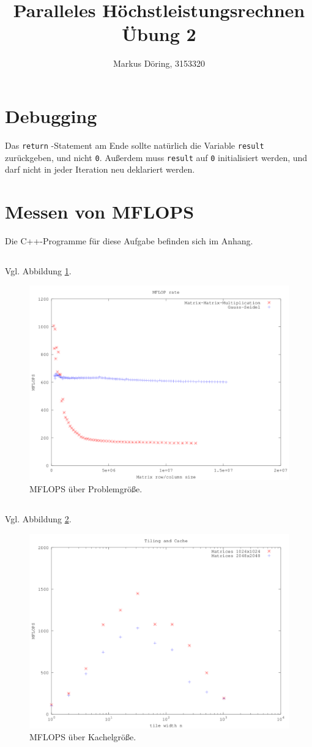 \documentclass[11pt,a4paper]{scrartcl}
\begin{document}
\title{Paralleles Höchstleistungsrechnen Übung 2}
\author{Markus Döring, 3153320}
\maketitle

\setcounter{section}{2}
\section{Debugging}
Das \lstinline !return! -Statement am Ende sollte natürlich die Variable \lstinline!result! zurückgeben, und nicht \lstinline!0!. 
Außerdem muss \lstinline!result! auf \lstinline!0! initialisiert werden, und darf nicht in jeder Iteration neu deklariert werden. 


\newpage
\section{Messen von MFLOPS}
Die C++-Programme für diese Aufgabe befinden sich im Anhang.
\subsection{}
Vgl. Abbildung \ref{fig:mflops}.
\begin{figure}[ht]
\centering
 \includegraphics[width=.65\linewidth]{mflops.png}
 \caption{MFLOPS über Problemgröße. }
 \label{fig:mflops}
\end{figure}


\setcounter{subsection}{2}
\subsection{}
Vgl. Abbildung \ref{fig:tiled}.
\begin{figure}[ht]
\centering
 \includegraphics[width=.65\linewidth]{tiled.png}
 \caption{MFLOPS über Kachelgröße. }
 \label{fig:tiled}
\end{figure}
\end{document}

